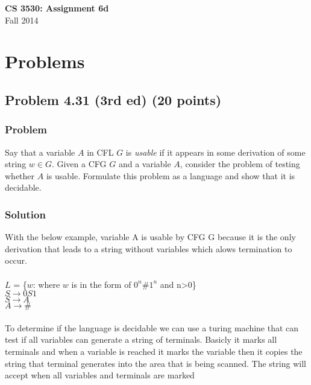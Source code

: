 \documentclass{article}
\begin{document}
\begin{center}
\textbf{\Large CS 3530: Assignment 6d} \\[2mm]
Fall 2014
\end{center}

\raggedright

\section*{Problems}

\subsection*{Problem 4.31 (3rd ed) (20 points)}

\subsubsection*{Problem}

Say that a variable $A$ in CFL $G$ is \textit{usable} if it appears
in some derivation of some string $w\in G$. Given a CFG $G$ and a
variable $A$, consider the problem of testing whether $A$ is usable.
Formulate this problem as a language and show that it is decidable.

\subsubsection*{Solution}

With the below example, variable A is usable by CFG G because it is the only derivation that leads to a string without variables which alows termination to occur. \\ \ \\
$L$ = \{$w$: where $w$ is in the form of $0^n\#1^n$ and n>0\} \\ 
$S \rightarrow 0S1$ \\
$S \rightarrow A$ \\
$A \rightarrow \#$ \\ \ \\
To determine if the language is decidable we can use a turing machine that can test if all variables can generate a string of terminals. Basicly it marks all terminals and when a variable is reached it marks the variable then it copies the string that terminal generates into the area that is being scanned. The string will accept when all variables and terminals are marked
\end{document}
